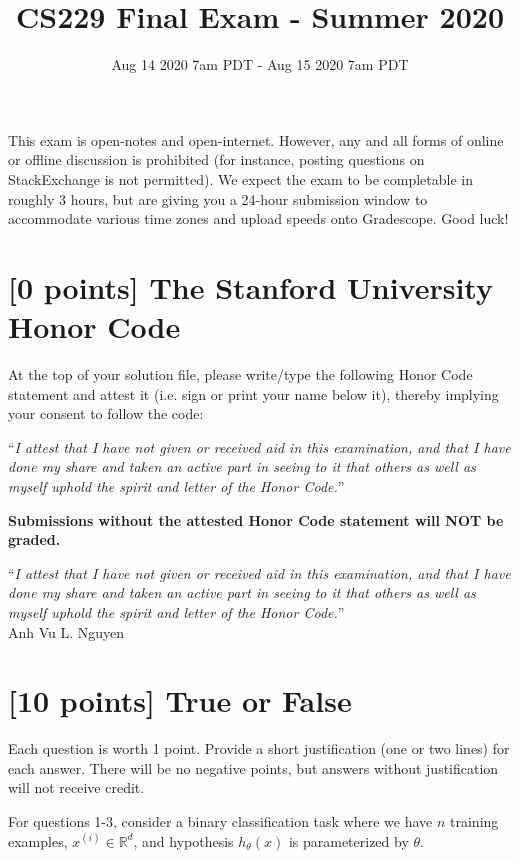 \documentclass{article}
\title{CS229 Final Exam - Summer 2020}
\date{Aug 14 2020 7am PDT - Aug 15 2020 7am PDT}
\begin{document}
\maketitle

 This exam is open-notes and open-internet. However, any and all forms of online or offline discussion is prohibited (for instance, posting questions on StackExchange is not permitted). We expect the exam to be completable in roughly 3 hours, but are giving you a 24-hour submission window to accommodate various time zones and upload speeds onto Gradescope. Good luck!

\section*{[0 points] The Stanford University Honor Code}

At the top of your solution file, please write/type the following Honor Code statement and attest it (i.e. sign or print your name below it), thereby implying your consent to follow the code:

``\textit{I attest that I have not given or received aid in this examination, and that
I have done my share and taken an active part in seeing to it that others
as well as myself uphold the spirit and letter of the Honor Code.}''

\textbf{Submissions without the attested Honor Code statement will NOT be graded.}

``\textit{I attest that I have not given or received aid in this examination, and that
I have done my share and taken an active part in seeing to it that others
as well as myself uphold the spirit and letter of the Honor Code.}''\\

Anh Vu L. Nguyen

\clearpage

\section{[10 points] True or False}

Each question is worth 1 point. Provide a short justification (one or two lines) for each answer. There will be no negative points, but answers without justification will not receive credit.

\bigskip

\noindent For questions 1-3, consider a binary classification task where we have $n$ training examples, $x^{(i)} \in \mathbb{R}^d$, and hypothesis $h_\theta(x)$ is parameterized by $\theta$. 
\end{document}
